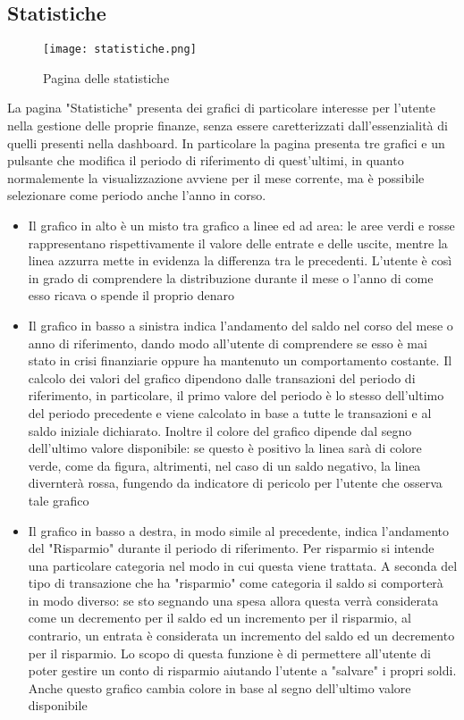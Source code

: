 \documentclass[binding=0.6cm, oneside, noexaminfo, italian]{sapthesis}
\begin{document}
\subsection{Statistiche}
\begin{figure}[h]
    \centering
    \texttt{[image: statistiche.png]}
    \caption{Pagina delle statistiche}
    \label{fig:statistiche}
\end{figure}
La pagina "Statistiche" presenta dei grafici di particolare interesse per l'utente nella gestione delle proprie finanze, senza essere caretterizzati dall'essenzialità di quelli presenti nella dashboard. In particolare la pagina presenta tre grafici e un pulsante che modifica il periodo di riferimento di quest'ultimi, in quanto normalemente la visualizzazione avviene per il mese corrente, ma è possibile selezionare come periodo anche l'anno in corso.
\begin{itemize}
    \item Il grafico in alto è un misto tra grafico a linee ed ad area: le aree verdi e rosse rappresentano rispettivamente il valore delle entrate e delle uscite, mentre la linea azzurra mette in evidenza la differenza tra le precedenti. L'utente è così in grado di comprendere la distribuzione durante il mese o l'anno di come esso ricava o spende il proprio denaro
    \item Il grafico in basso a sinistra indica l'andamento del saldo nel corso del mese o anno di riferimento, dando modo all'utente di comprendere se esso è mai stato in crisi finanziarie oppure ha mantenuto un comportamento costante. Il calcolo dei valori del grafico dipendono dalle transazioni del periodo di riferimento, in particolare, il primo valore del periodo è lo stesso dell'ultimo del periodo precedente e viene calcolato in base a tutte le transazioni e al saldo iniziale dichiarato. Inoltre il colore del grafico dipende dal segno dell'ultimo valore disponibile: se questo è positivo la linea sarà di colore verde, come da figura, altrimenti, nel caso di un saldo negativo, la linea divernterà rossa, fungendo da indicatore di pericolo per l'utente che osserva tale grafico
    \item Il grafico in basso a destra, in modo simile al precedente, indica l'andamento del "Risparmio" durante il periodo di riferimento. Per risparmio si intende una particolare categoria nel modo in cui questa viene trattata. A seconda del tipo di transazione che ha "risparmio" come categoria il saldo si comporterà in modo diverso: se sto segnando una spesa allora questa verrà considerata come un decremento per il saldo ed un incremento per il risparmio, al contrario, un entrata è considerata un incremento del saldo ed un decremento per il risparmio. Lo scopo di questa funzione è di permettere all'utente di poter gestire un conto di risparmio aiutando l'utente a "salvare" i propri soldi. Anche questo grafico cambia colore in base al segno dell'ultimo valore disponibile
\end{itemize}
\end{document}
